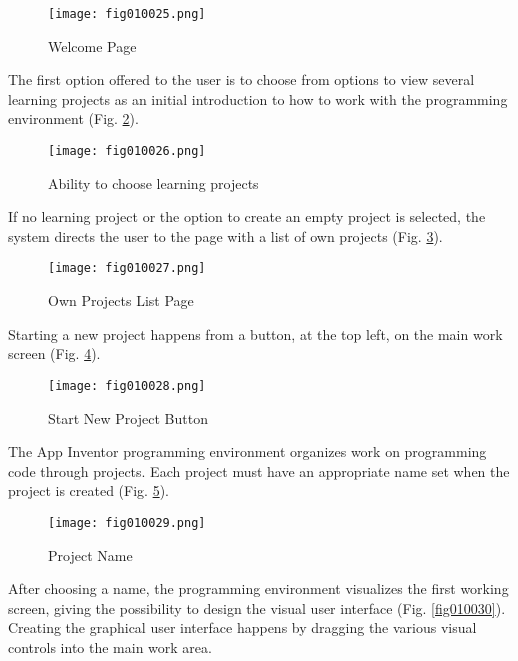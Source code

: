 \begin{figure}[H]
   \centering
   \texttt{[image: fig010025.png]}
   \caption{Welcome Page}
\label{fig010025}
\end{figure}

The first option offered to the user is to choose from options to view several learning projects as an initial introduction to how to work with the programming environment (Fig. \ref{fig010026}).

\begin{figure}[H]
   \centering
   \texttt{[image: fig010026.png]}
   \caption{Ability to choose learning projects}
\label{fig010026}
\end{figure}

If no learning project or the option to create an empty project is selected, the system directs the user to the page with a list of own projects (Fig. \ref{fig010027}).

\begin{figure}[H]
   \centering
   \texttt{[image: fig010027.png]}
   \caption{Own Projects List Page}
\label{fig010027}
\end{figure}

Starting a new project happens from a button, at the top left, on the main work screen (Fig. \ref{fig010028}).

\begin{figure}[H]
   \centering
   \texttt{[image: fig010028.png]}
   \caption{Start New Project Button}
\label{fig010028}
\end{figure}

The App Inventor programming environment organizes work on programming code through projects. Each project must have an appropriate name set when the project is created (Fig. \ref{fig010029}).

\begin{figure}[H]
   \centering
   \texttt{[image: fig010029.png]}
   \caption{Project Name}
\label{fig010029}
\end{figure}

After choosing a name, the programming environment visualizes the first working screen, giving the possibility to design the visual user interface (Fig. \ref{fig010030}). Creating the graphical user interface happens by dragging the various visual controls into the main work area.

